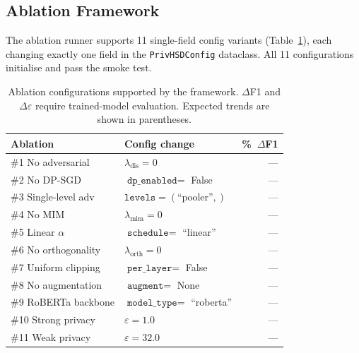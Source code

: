 \documentclass{article}
\begin{document}
\subsection{Ablation Framework}

The ablation runner supports 11 single-field config variants
(Table~\ref{tab:ablations}), each changing exactly one field in the
\texttt{PrivHSDConfig} dataclass.
All 11 configurations initialise and pass the smoke test.


\begin{table}[h]
  \centering
  \caption{Ablation configurations supported by the framework.
           $\Delta$F1 and $\Delta\varepsilon$ require trained-model
           evaluation. Expected trends are shown in parentheses.}
  \label{tab:ablations}
  \begin{tabular}{llr}
    \toprule
    \textbf{Ablation} & \textbf{Config change} & \%~\textbf{$\Delta$F1} \\
    \midrule
    \#1 No adversarial & $\lambda_{\text{dis}} = 0$ & --- \\
    \#2 No DP-SGD & $\texttt{dp\_enabled}=$ False & --- \\
    \#3 Single-level adv & $\texttt{levels}=(\text{``pooler''},)$ & --- \\
    \#4 No MIM & $\lambda_{\text{mim}} = 0$ & --- \\
    \#5 Linear $\alpha$ & $\texttt{schedule}=$ ``linear'' & --- \\
    \#6 No orthogonality & $\lambda_{\text{orth}} = 0$ & --- \\
    \#7 Uniform clipping & $\texttt{per\_layer}=$ False & --- \\
    \#8 No augmentation & $\texttt{augment}=$ None & --- \\
    \#9 RoBERTa backbone & $\texttt{model\_type}=$ ``roberta'' & --- \\
    \#10 Strong privacy & $\varepsilon=1.0$ & --- \\
    \#11 Weak privacy & $\varepsilon=32.0$ & --- \\
    \bottomrule
  \end{tabular}
\end{table}

\end{document}
